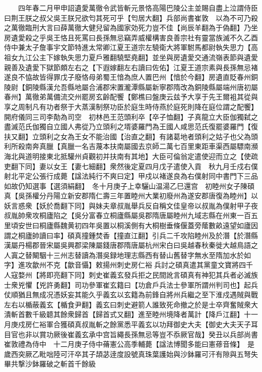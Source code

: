 　　四年春二月甲申詔遺愛萬徹令武皆斬元景恪高陽巴陵公主並賜自盡上泣謂侍臣曰荆王朕之叔父吳王朕兄欲匄其死可乎【匄居大翻】兵部尚書崔敦　以為不可乃殺之萬徹臨刑大言曰薛萬徹大健兒留為國家効死力豈不佳【尚辰羊翻為于偽翻】乃坐房遺愛殺之乎吳王恪且死罵曰長孫無忌竊弄威權構害良善宗社有靈當族滅不久乙酉侍中兼太子詹事宇文節特進太常卿江夏王道宗左驍衛大將軍駙馬都尉執失思力【高祖女九江公主下嫁執失思力夏戶雅翻驍堅堯翻】並坐與房遺愛交通流嶺表節與遺愛親善及遺愛下獄節頗左右之【下遐嫁翻左右讀曰佐佑】江夏王道宗素與長孫無忌褚遂良不恊故皆得罪戊子廢恪母弟蜀王愔為庶人置巴州【愔於今翻】房遺直貶春州銅陵尉【銅陵縣漢允吾縣地屬合浦郡宋置瀧潭縣屬新寧郡隋改為銅陵縣屬端州唐初屬春州】萬徹弟萬備流交州罷房玄齡配饗【鄭樵曰盤庚云兹予大享于先王爾袓其從與享之周制凡有功者祭于大蒸漢制祭功臣於庭生時侍燕於庭死則降在庭位謂之配饗】開府儀同三司李勣為司空　初林邑王范頭利卒【卒子恤翻】子真龍立大臣伽獨弑之盡滅范氏伽獨自立國人弗從乃立頭利之壻婆羅門為王國人咸思范氏復罷婆羅門【復扶又翻】立頭利之女為王女不能治國【治直之翻】有諸葛地者頭利之姑子也父為頭利所殺南奔真臘【真臘一名吉蔑本扶南屬國去京師二萬七百里東距車渠西屬驃南瀕海北與道明接東北抵驩州貞觀初并扶南有其地】大臣可倫翁定遣使迎而立之【使疏吏翻下同】妻以女王【妻七細翻】衆然後定夏四月戊子遣使入貢　秋九月壬戍右僕射北平定公張行成薨【諡法純行不爽曰定】甲戍以褚遂良為右僕射同中書門下三品如故仍知選事【選須絹翻】　冬十月庚子上幸驪山温湯乙巳還宫　初睦州女子陳碩真【吳孫權分丹陽立新安郡隋仁壽三年置睦州大業初廢州為遂安郡唐復為睦州】以妖言惑衆【妖於喬翻下同】與妹夫章叔胤舉兵反自稱文佳皇帝以叔胤為僕射甲子夜叔胤帥衆攻桐廬陷之【吳分富春立桐廬縣屬吳郡隋唐屬睦州九域志縣在州東一百五里頃安世曰桐廬縣魏黄初四年吳置以桐溪側有大桐樹垂條偃蓋旁䕃數畝遠望如廬因謂之桐廬帥讀曰率】碩真撞鍾焚香【撞直江翻】引兵二千攻陷睦州及於潛【於潛縣漢屬丹楊郡晉宋屬吳興郡梁陳屬錢唐郡隋唐屬杭州宋白曰吳越春秋秦徙大越鳥語之人寘之替闞駰十三州志替讀為潛吳録地理志縣西有替山舊替字無水至隋加水於如字】進攻歙州不克【歙音懾】敕揚州刺史房仁裕兵討之碩真遣其黨童文寶將四千人寇婺州【將即亮翻下同】刺史崔義玄發兵拒之民間訛言碩真有神犯其兵者必滅族士衆兇懼【兇許勇翻】司功參軍崔玄籍曰【功倉戶兵法士參軍所謂州判司也】起兵仗順猶且無成况憑妖妄其能久乎義玄以玄籍為前鋒自將州兵繼之至下淮戍遇賊與戰左右以楯蔽義玄【楯食尹翻】義玄曰刺史避箭人誰致死命撤之於是士卒齊奮賊衆大潰斬首數千級聼其餘衆歸首【歸首式又翻】進至睦州境降者萬計【降戶江翻】十一月庚戍房仁裕軍合獲碩真叔胤斬之餘黨悉平義玄以功拜御史大夫【御史大夫天子耳目官也非以賞功厥後崔義玄承中宫旨繩長孫無忌等豈不忝厥官哉】癸丑以兵部尚書崔敦禮為侍中　十二月庚子侍中蓨憲公高季輔薨【諡法博聞多能曰憲蓚音條】　是歲西突厥乙毗咄陸可汗卒其子頡苾逹度設號真珠葉護始與沙鉢羅可汗有隙與五弩失畢共撃沙鉢羅破之斬首千餘級

